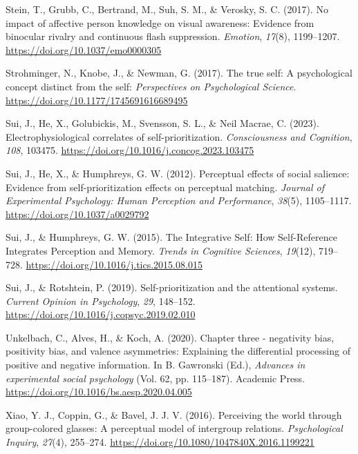 \documentclass[
  man]{apa6}
\newlength{\cslhangindent}
\newlength{\cslentryspacingunit} %
\newenvironment{CSLReferences}[2] %
 {%
  \setlength{\parindent}{0pt}
  \ifodd #1
  \let\oldpar\par
  \def\par{\hangindent=\cslhangindent\oldpar}
  \fi
  \setlength{\parskip}{#2\cslentryspacingunit}
 }%
 {}
\begin{document}
\begin{CSLReferences}{1}{0}
\leavevmode{}%
Stein, T., Grubb, C., Bertrand, M., Suh, S. M., \& Verosky, S. C. (2017). No impact of affective person knowledge on visual awareness: Evidence from binocular rivalry and continuous flash suppression. \emph{Emotion}, \emph{17}(8), 1199--1207. \url{https://doi.org/10.1037/emo0000305}

\leavevmode{}%
Strohminger, N., Knobe, J., \& Newman, G. (2017). The true self: A psychological concept distinct from the self: \emph{Perspectives on Psychological Science}. \url{https://doi.org/10.1177/1745691616689495}

\leavevmode{}%
Sui, J., He, X., Golubickis, M., Svensson, S. L., \& Neil Macrae, C. (2023). Electrophysiological correlates of self-prioritization. \emph{Consciousness and Cognition}, \emph{108}, 103475. \url{https://doi.org/10.1016/j.concog.2023.103475}

\leavevmode{}%
Sui, J., He, X., \& Humphreys, G. W. (2012). Perceptual effects of social salience: Evidence from self-prioritization effects on perceptual matching. \emph{Journal of Experimental Psychology: Human Perception and Performance}, \emph{38}(5), 1105--1117. \url{https://doi.org/10.1037/a0029792}

\leavevmode{}%
Sui, J., \& Humphreys, G. W. (2015). The {Integrative} {Self}: {How} {Self}-{Reference} {Integrates} {Perception} and {Memory}. \emph{Trends in Cognitive Sciences}, \emph{19}(12), 719--728. \url{https://doi.org/10.1016/j.tics.2015.08.015}

\leavevmode{}%
Sui, J., \& Rotshtein, P. (2019). Self-prioritization and the attentional systems. \emph{Current Opinion in Psychology}, \emph{29}, 148--152. \url{https://doi.org/10.1016/j.copsyc.2019.02.010}

\leavevmode{}%
Unkelbach, C., Alves, H., \& Koch, A. (2020). Chapter three - negativity bias, positivity bias, and valence asymmetries: Explaining the differential processing of positive and negative information. In B. Gawronski (Ed.), \emph{Advances in experimental social psychology} (Vol. 62, pp. 115--187). Academic Press. \url{https://doi.org/10.1016/bs.aesp.2020.04.005}

\leavevmode{}%
Xiao, Y. J., Coppin, G., \& Bavel, J. J. V. (2016). Perceiving the world through group-colored glasses: A perceptual model of intergroup relations. \emph{Psychological Inquiry}, \emph{27}(4), 255--274. \url{https://doi.org/10.1080/1047840X.2016.1199221}

\end{CSLReferences}

\endgroup
\end{document}
